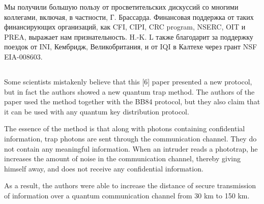 Мы получили большую пользу от просветительских дискуссий со многими коллегами, включая, в частности, Г. Брассарда. Финансовая поддержка от таких финансирующих организаций, как CFI, CIPI, CRC program, NSERC, OIT и PREA, выражает нам признательность. H.-K. L также благодарит за поддержку поездок от INI, Кембридж, Великобритания, и от IQI в Калтехе через грант NSF EIA-008603.

\subsection{\review}
Some scientists mistakenly believe that this [6] paper presented a new protocol, but in fact the authors showed a new quantum trap method. The authors of the paper used the method together with the BB84 protocol, but they also claim that it can be used with any quantum key distribution protocol.

The essence of the method is that along with photons containing confidential information, trap photons are sent through the communication channel. They do not contain any meaningful information. When an intruder reads a phototrap, he increases the amount of noise in the communication channel, thereby giving himself away, and does not receive any confidential information.

As a result, the authors were able to increase the distance of secure transmission of information over a quantum communication channel from 30 km to 150 km.


\subsection{\dic}
